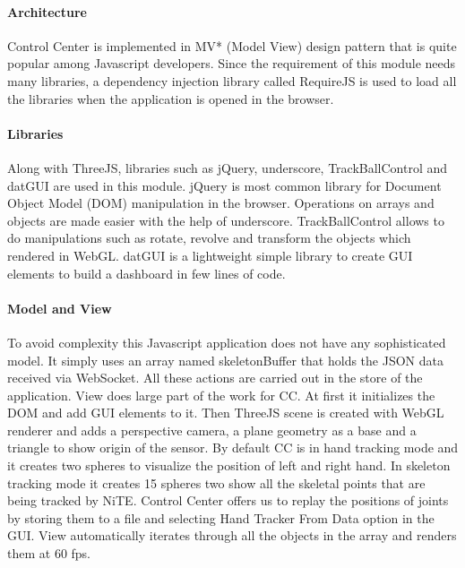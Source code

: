 \paragraph*{Architecture} Control Center is implemented in MV* (Model View) design pattern that is quite popular among Javascript developers. Since the requirement of this module needs many libraries, a dependency injection library called RequireJS is used to load all the libraries when the application is opened in the browser.  

\paragraph*{Libraries} Along with ThreeJS, libraries such as jQuery, underscore, TrackBallControl and datGUI are used in this module. jQuery is most common library for Document Object Model (DOM) manipulation in the browser. Operations on arrays and objects are made easier with the help of underscore. TrackBallControl allows to do manipulations such as rotate, revolve and transform the objects which rendered in WebGL. datGUI is a lightweight simple library to create GUI elements to build a dashboard in few lines of code.



\paragraph*{Model and View} To avoid complexity this Javascript application does not have any sophisticated model. It simply uses an array named skeletonBuffer that holds the JSON data received via WebSocket. All these actions are carried out in the store of the application. View does large part of the work for CC. At first it initializes the DOM and add GUI elements to it. Then ThreeJS scene is created with WebGL renderer and adds a perspective camera, a plane geometry as a base and a triangle to show origin of the sensor. By default CC is in hand tracking mode and it creates two spheres to visualize the position of left and right hand. In skeleton tracking mode it creates 15 spheres two show all the skeletal points that are being tracked by NiTE. Control Center offers us to replay the positions of joints by storing them to a file and selecting Hand Tracker From Data option in the GUI. View automatically iterates through all the objects in the array and renders them at 60 fps. 

